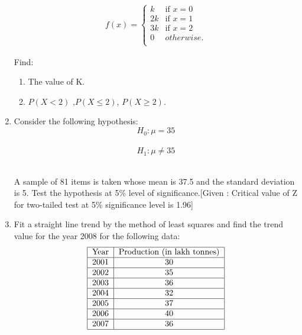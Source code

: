 \documentclass[a4paper,12pt]{article}
\begin{document}
\begin{enumerate}
\begin{align}
f(x) = \left\{
\begin{array}{ll}
  k & \text{if } x = 0 \\
  2k & \text{if } x = 1\\
  3k & \text{if } x = 2\\
  0 & otherwise.\\
\end{array}
\right.
\end{align}

Find:\
\begin{enumerate}
\item The value of K.
\item $P(X< 2)$ ,$P(X \leq 2)$, $P(X \geq 2)$.
\end{enumerate}

\item Consider the following hypothesis: \
$$H_0: \mu = 35$$\
$$H_1: \mu \neq 35$$\

A sample of 81 items is taken whose mean is 37.5 and the standard deviation is 5. Test the hypothesis at 5\% level of significance.[Given : Critical value of Z for two-tailed test at 5\% significance level is 1.96]

\item Fit a straight line trend by the method of least squares and  find the trend value for the year 2008 for the following data:\\
$$\begin{tabular}{|c|c|}
\hline
Year & Production (in lakh tonnes) \\
\hline
2001 & 30 \\
\hline 
2002 & 35 \\
\hline 
2003 & 36 \\
\hline 
2004 & 32 \\
\hline 
2005 & 37 \\
\hline 
2006 & 40 \\
\hline 
2007 & 36 \\
\hline 
\end{tabular}$$

\end{enumerate}
\end{document}
